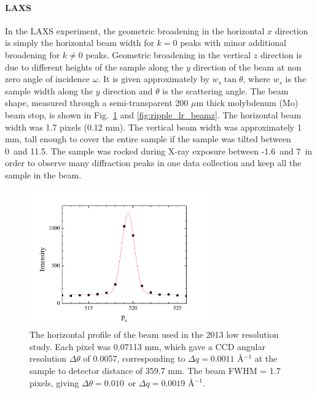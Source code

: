 \paragraph{LAXS}
In the LAXS experiment, 
the geometric broadening in the horizontal $x$ direction is simply the 
horizontal beam width for $k=0$ peaks with minor additional broadening
for $k\neq 0$ peaks. Geometric broadening in the vertical $z$ direction
is due to different heights of the sample along the $y$ direction of the beam 
at non zero angle of incidence $\omega$. It is given approximately by
$w_s\tan\theta$, where $w_s$ is the sample width along the $y$
direction and $\theta$ is the scattering angle.
The beam shape, measured through a semi-transparent 200 $\mu$m thick
molybdenum (Mo) beam stop, is shown in Fig.~\ref{fig:ripple_lr_beamx}
and \ref{fig:ripple_lr_beamz}.
The horizontal beam width was 1.7 pixels (0.12 mm). The vertical beam
width was approximately 1 mm, tall enough to cover the entire sample
if the sample was tilted between 0\textdegree\ and 11.5\textdegree. 
The sample was rocked
during X-ray exposure between -1.6\textdegree\ and 7\textdegree\ 
in order to observe many diffraction peaks in one data collection
and keep all the sample in the beam. 

\begin{figure}[p]
  \centering
  \includegraphics[width=0.7\textwidth]{figures/ripple/MMs/laxs/beamx_lr}
  \caption{The horizontal profile of the beam used in the 2013 low resolution study.
  Each pixel was 0.07113 mm, which gave a CCD angular resolution $\Delta\theta$ of 
  0.0057\textdegree, corresponding to $\Delta q=0.0011$ \AA$^{-1}$ at the 
  sample to detector distance of 359.7 mm. 
  The beam FWHM = 1.7 pixels, giving $\Delta\theta = 0.010$\textdegree\ or
  $\Delta q= 0.0019$ \AA$^{-1}$.}
  \label{fig:ripple_lr_beamx}
\end{figure}

